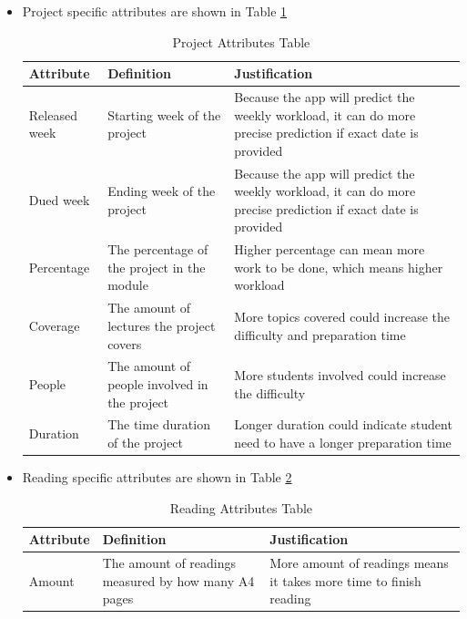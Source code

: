 \documentclass[fyp]{socreport}
\begin{document}
\begin{itemize}
	\item Project specific attributes are shown in Table {\ref{project-attribute}}
	\begin{table}[]
	\centering
	\begin{tabular}{|p{}|p{}|p{}|}
	\hline
		\rowcolor[HTML]{C0C0C0}
	  \textbf{Attribute} & \textbf{Definition} & \textbf{Justification} \\
	\hline
	Released week & Starting week of the project & Because the app will predict the weekly workload, it can do more precise prediction if exact date is provided \\
	\hline
	Dued week & Ending week of the project & Because the app will predict the weekly workload, it can do more precise prediction if exact date is provided \\
	\hline
	Percentage & The percentage of the project in the module & Higher percentage can mean more work to be done, which means higher workload \\
	\hline
	Coverage & The amount of lectures the project covers & More topics covered could increase the difficulty and preparation time \\
	\hline
	People & The amount of people involved in the project & More students involved could increase the difficulty \\
	\hline
	Duration & The time duration of the project & Longer duration could indicate student need to have a longer preparation time \\
	\hline
	\end{tabular}
	\caption{Project Attributes Table}
	\label{project-attribute}
	\end{table}

	\item Reading specific attributes are shown in Table {\ref{reading-attribute}}
	\begin{table}[]
	\centering
	\begin{tabular}{|p{}|p{}|p{}|}
	\hline
		\rowcolor[HTML]{C0C0C0}
	  \textbf{Attribute} & \textbf{Definition} & \textbf{Justification} \\
	\hline
	Amount & The amount of readings measured by how many A4 pages & More amount of readings means it takes more time to finish reading \\
	\hline
	\end{tabular}
	\caption{Reading Attributes Table}
	\label{reading-attribute}
	\end{table}


\end{itemize}
\end{document}
